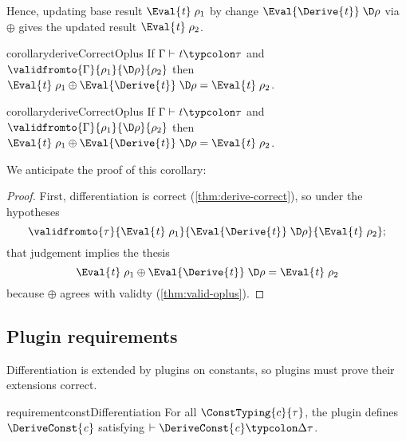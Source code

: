 Hence, updating base result \ensuremath{\Eval{\Varid{t}}\;\rho_{1}} by change
\ensuremath{\Eval{\Derive{\Varid{t}}}\;\D\rho} via \ensuremath{\oplus } gives the updated result
\ensuremath{\Eval{\Varid{t}}\;\rho_{2}}.
\begin{fullCompile}
\begin{restatable*}{corollary}{deriveCorrectOplus}
  \label{thm:derive-correct-oplus}
  If \ensuremath{\Gamma\vdash\Varid{t}\typcolon\tau} and \ensuremath{\validfromto{\Gamma}{\rho_{1}}{\D\rho}{\rho_{2}}} then
  \ensuremath{\Eval{\Varid{t}}\;\rho_{1}\oplus \Eval{\Derive{\Varid{t}}}\;\D\rho\mathrel{=}\Eval{\Varid{t}}\;\rho_{2}}.
\end{restatable*}
\end{fullCompile}
\begin{partCompile}
\begin{restatable}{corollary}{deriveCorrectOplus}
  \label{thm:derive-correct-oplus}
  If \ensuremath{\Gamma\vdash\Varid{t}\typcolon\tau} and \ensuremath{\validfromto{\Gamma}{\rho_{1}}{\D\rho}{\rho_{2}}} then
  \ensuremath{\Eval{\Varid{t}}\;\rho_{1}\oplus \Eval{\Derive{\Varid{t}}}\;\D\rho\mathrel{=}\Eval{\Varid{t}}\;\rho_{2}}.
\end{restatable}
\end{partCompile}
We anticipate the proof of this corollary:
\begin{proof}
  First, differentiation is correct (\cref{thm:derive-correct}), so under the hypotheses
  \[\ensuremath{\validfromto{\tau}{\Eval{\Varid{t}}\;\rho_{1}}{\Eval{\Derive{\Varid{t}}}\;\D\rho}{\Eval{\Varid{t}}\;\rho_{2}}};\]
  that judgement implies the thesis \[\ensuremath{\Eval{\Varid{t}}\;\rho_{1}\oplus \Eval{\Derive{\Varid{t}}}\;\D\rho\mathrel{=}\Eval{\Varid{t}}\;\rho_{2}}\]
  because \ensuremath{\oplus } agrees with validty (\cref{thm:valid-oplus}).
\end{proof}

\subsection{Plugin requirements}
Differentiation is extended by plugins on constants, so plugins
must prove their extensions correct.

\begin{restatable}{requirement}{constDifferentiation}
  \label{req:const-differentiation}
  For all $\ConstTyping{c}{\tau}$, the plugin defines
  \ensuremath{\DeriveConst{\Varid{c}}} satisfying \ensuremath{\vdash\DeriveConst{\Varid{c}}\typcolon\Delta \tau}.
\end{restatable}

